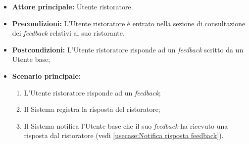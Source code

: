\label{usecase:Risposta ad un feedback}
\begin{itemize}
	\item \textbf{Attore principale:} Utente ristoratore.

	\item \textbf{Precondizioni:} L'Utente ristoratore è entrato nella sezione di consultazione dei \textit{feedback} relativi al suo ristorante.

	\item \textbf{Postcondizioni:} L'Utente ristoratore risponde ad un \textit{feedback} scritto da un Utente base;


	\item \textbf{Scenario principale:}
	      \begin{enumerate}
		      \item L'Utente ristoratore risponde ad un \textit{feedback};
		      \item Il Sistema registra la risposta del ristoratore;
		      \item Il Sistema notifica l'Utente base che il suo \textit{feedback} ha ricevuto una risposta dal ristoratore (vedi \autoref{usecase:Notifica risposta feedback}).

	      \end{enumerate}
\end{itemize}
